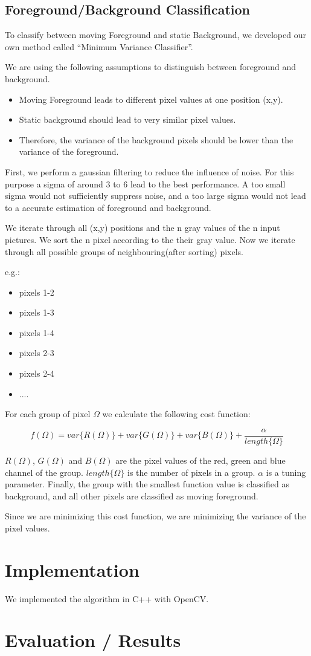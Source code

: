 \section{Foreground/Background Classification}

To classify between moving Foreground and static Background, we developed our own method called
``Minimum Variance Classifier''.

We are using the following assumptions to distinguish between foreground and background.

\begin{itemize}
 \item Moving Foreground leads to different pixel values at one position (x,y).
 \item Static background should lead to very similar pixel values.
 \item Therefore, the variance of the background pixels should be lower than the variance of the foreground.
\end{itemize}
 
First, we perform a gaussian filtering to reduce the influence of noise. For this purpose a sigma
of around 3 to 6 lead to the best performance. A too small sigma would not sufficiently suppress noise,
and a too large sigma would not lead to a accurate estimation of foreground and background.

We iterate through all (x,y) positions and the n gray values of the n input pictures.
We sort the n pixel according to the their gray value.
Now we iterate through all possible groups of neighbouring(after sorting) pixels.

e.g.:
\begin{itemize}
 \item pixels 1-2
 \item pixels 1-3
 \item pixels 1-4
 \item pixels 2-3
 \item pixels 2-4
 \item ....
\end{itemize}

For each group of pixel $\Omega$ we calculate the following cost function:

$$
f(\Omega) = var\{R(\Omega)\} + var\{G(\Omega)\} + var\{B(\Omega)\} + \frac{\alpha}{length\{\Omega\}}
$$

$R(\Omega)$, $G(\Omega)$ and $B(\Omega)$ are the pixel values of the red, green and blue channel
of the group. $length\{\Omega\}$ is the number of pixels in a group. $\alpha$ is a tuning parameter.
Finally, the group with the smallest function value is classified as background, and all
other pixels are classified as moving foreground.

Since we are minimizing this cost function, we are minimizing the variance of the pixel values.



\chapter{Implementation}

We implemented the algorithm in C++ with OpenCV.

\chapter{Evaluation / Results}







